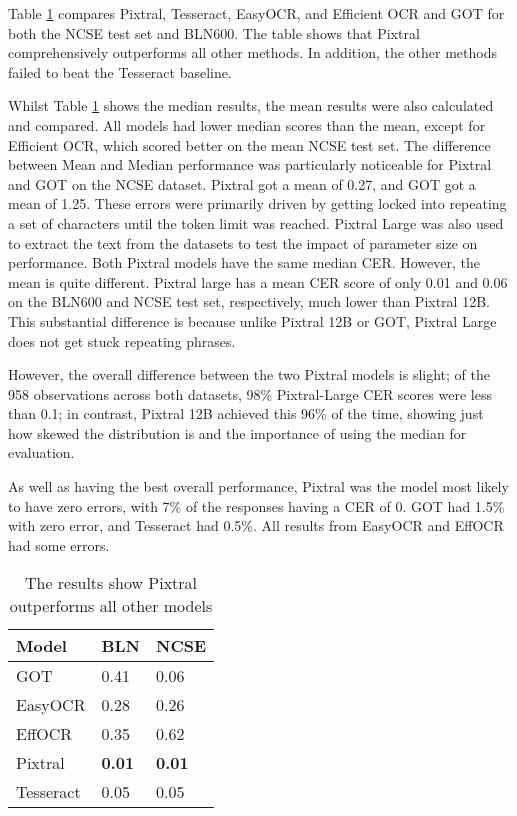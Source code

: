 \documentclass{article} %
\begin{document}
Table \ref{tab:model_results} compares Pixtral, Tesseract, EasyOCR, and Efficient OCR and GOT for both the NCSE test set and BLN600. The table shows that Pixtral comprehensively outperforms all other methods. In addition, the other methods failed to beat the Tesseract baseline.

Whilst Table \ref{tab:model_results} shows the median results, the mean results were also calculated and compared. All models had lower median scores than the mean, except for Efficient OCR, which scored better on the mean NCSE test set. The difference between Mean and Median performance was particularly noticeable for Pixtral and GOT on the NCSE dataset. Pixtral got a mean of 0.27, and GOT got a mean of 1.25. These errors were primarily driven by getting locked into repeating a set of characters until the token limit was reached. Pixtral Large was also used to extract the text from the datasets to test the impact of parameter size on performance. Both Pixtral models have the same median CER. However, the mean is quite different. Pixtral large has a mean CER score of only 0.01 and 0.06 on the BLN600 and NCSE test set, respectively, much lower than Pixtral 12B. This substantial difference is because unlike Pixtral 12B or GOT, Pixtral Large does not get stuck repeating phrases. 

However, the overall difference between the two Pixtral models is slight; of the 958 observations across both datasets, 98\% Pixtral-Large CER scores were less than 0.1; in contrast, Pixtral 12B achieved this 96\% of the time, showing just how skewed the distribution is and the importance of using the median for evaluation.

As well as having the best overall performance, Pixtral was the model most likely to have zero errors, with 7\% of the responses having a CER of 0. GOT had 1.5\% with zero error, and Tesseract had 0.5\%. All results from EasyOCR and EffOCR had some errors.



\begin{table}
\caption{The results show Pixtral outperforms all other models}
\label{tab:model_results}
\begin{tabular}{lll}
\toprule
Model & BLN & NCSE \\
\midrule
GOT & 0.41 & 0.06 \\
EasyOCR & 0.28 & 0.26 \\
EffOCR & 0.35 & 0.62 \\
Pixtral & \textbf{0.01} & \textbf{0.01} \\
Tesseract & 0.05 & 0.05 \\
\bottomrule
\end{tabular}
\end{table}
\end{document}
